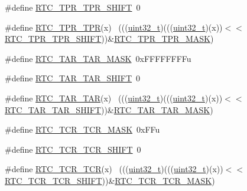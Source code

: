 \begin{DoxyCompactItemize}
\item 
\#define \hyperlink{group___r_t_c___register___masks_ga624a290f73478b3ca2687ac49cc78fb2}{R\+T\+C\+\_\+\+T\+P\+R\+\_\+\+T\+P\+R\+\_\+\+S\+H\+I\+FT}~0
\item 
\#define \hyperlink{group___r_t_c___register___masks_gaa16b7c11dc2683ecd02be0f187100e98}{R\+T\+C\+\_\+\+T\+P\+R\+\_\+\+T\+PR}(x)                                                  ~(((\hyperlink{_p_e___types_8h_a33594304e786b158f3fb30289278f5af}{uint32\+\_\+t})(((\hyperlink{_p_e___types_8h_a33594304e786b158f3fb30289278f5af}{uint32\+\_\+t})(x))$<$$<$\hyperlink{group___r_t_c___register___masks_ga624a290f73478b3ca2687ac49cc78fb2}{R\+T\+C\+\_\+\+T\+P\+R\+\_\+\+T\+P\+R\+\_\+\+S\+H\+I\+FT}))\&\hyperlink{group___r_t_c___register___masks_ga2682f687fa561be2f002fc574d48cc79}{R\+T\+C\+\_\+\+T\+P\+R\+\_\+\+T\+P\+R\+\_\+\+M\+A\+SK})
\item 
\#define \hyperlink{group___r_t_c___register___masks_ga649a76416ad00079054bd866565dada2}{R\+T\+C\+\_\+\+T\+A\+R\+\_\+\+T\+A\+R\+\_\+\+M\+A\+SK}~0x\+F\+F\+F\+F\+F\+F\+F\+Fu
\item 
\#define \hyperlink{group___r_t_c___register___masks_ga9ec8791d91dc36f0f59a7705988f7278}{R\+T\+C\+\_\+\+T\+A\+R\+\_\+\+T\+A\+R\+\_\+\+S\+H\+I\+FT}~0
\item 
\#define \hyperlink{group___r_t_c___register___masks_ga817df24c688f5b9031ce69c919c9337f}{R\+T\+C\+\_\+\+T\+A\+R\+\_\+\+T\+AR}(x)                                                  ~(((\hyperlink{_p_e___types_8h_a33594304e786b158f3fb30289278f5af}{uint32\+\_\+t})(((\hyperlink{_p_e___types_8h_a33594304e786b158f3fb30289278f5af}{uint32\+\_\+t})(x))$<$$<$\hyperlink{group___r_t_c___register___masks_ga9ec8791d91dc36f0f59a7705988f7278}{R\+T\+C\+\_\+\+T\+A\+R\+\_\+\+T\+A\+R\+\_\+\+S\+H\+I\+FT}))\&\hyperlink{group___r_t_c___register___masks_ga649a76416ad00079054bd866565dada2}{R\+T\+C\+\_\+\+T\+A\+R\+\_\+\+T\+A\+R\+\_\+\+M\+A\+SK})
\item 
\#define \hyperlink{group___r_t_c___register___masks_ga48a96d1de8db1993bfac3ca9d6bdb227}{R\+T\+C\+\_\+\+T\+C\+R\+\_\+\+T\+C\+R\+\_\+\+M\+A\+SK}~0x\+F\+Fu
\item 
\#define \hyperlink{group___r_t_c___register___masks_ga0d8bc8c79b8010b8ebb94562428713fe}{R\+T\+C\+\_\+\+T\+C\+R\+\_\+\+T\+C\+R\+\_\+\+S\+H\+I\+FT}~0
\item 
\#define \hyperlink{group___r_t_c___register___masks_gae677a99c22f7ba8c9c872446e4d8dc09}{R\+T\+C\+\_\+\+T\+C\+R\+\_\+\+T\+CR}(x)                                                  ~(((\hyperlink{_p_e___types_8h_a33594304e786b158f3fb30289278f5af}{uint32\+\_\+t})(((\hyperlink{_p_e___types_8h_a33594304e786b158f3fb30289278f5af}{uint32\+\_\+t})(x))$<$$<$\hyperlink{group___r_t_c___register___masks_ga0d8bc8c79b8010b8ebb94562428713fe}{R\+T\+C\+\_\+\+T\+C\+R\+\_\+\+T\+C\+R\+\_\+\+S\+H\+I\+FT}))\&\hyperlink{group___r_t_c___register___masks_ga48a96d1de8db1993bfac3ca9d6bdb227}{R\+T\+C\+\_\+\+T\+C\+R\+\_\+\+T\+C\+R\+\_\+\+M\+A\+SK})
$$
\end{DoxyCompactItemize}
